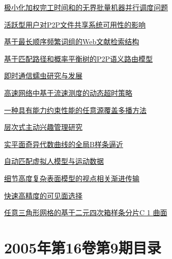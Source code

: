 \documentclass[a4paper]{article}
\begin{document}
\href{http://www.jos.org.cn/ch/reader/download_pdf.aspx?file_no=20061005&year_id=2006&quarter_id=10&falg=1}{极小化加权完工时间和的无界批量机器并行调度问题}

\href{http://www.jos.org.cn/ch/reader/download_pdf.aspx?file_no=20061007&year_id=2006&quarter_id=10&falg=1}{活跃型用户对P2P文件共享系统可用性的影响}

\href{http://www.jos.org.cn/ch/reader/download_pdf.aspx?file_no=20061008&year_id=2006&quarter_id=10&falg=1}{基于最长顺序频繁词组的Web文献检索结构}

\href{http://www.jos.org.cn/ch/reader/download_pdf.aspx?file_no=20061009&year_id=2006&quarter_id=10&falg=1}{基于匹配路径和概率平衡树的P2P语义路由模型}

\href{http://www.jos.org.cn/ch/reader/download_pdf.aspx?file_no=20061010&year_id=2006&quarter_id=10&falg=1}{即时通信蠕虫研究与发展}

\href{http://www.jos.org.cn/ch/reader/download_pdf.aspx?file_no=20061012&year_id=2006&quarter_id=10&falg=1}{高速网络中基于流速测度的动态超时策略}

\href{http://www.jos.org.cn/ch/reader/download_pdf.aspx?file_no=20061013&year_id=2006&quarter_id=10&falg=1}{一种具有能力约束性能的任意源覆盖多播方法}

\href{http://www.jos.org.cn/ch/reader/download_pdf.aspx?file_no=20061014&year_id=2006&quarter_id=10&falg=1}{层次式主动兴趣管理研究}

\href{http://www.jos.org.cn/ch/reader/download_pdf.aspx?file_no=20061015&year_id=2006&quarter_id=10&falg=1}{实平面奇异代数曲线的全局B样条逼近}

\href{http://www.jos.org.cn/ch/reader/download_pdf.aspx?file_no=20061016&year_id=2006&quarter_id=10&falg=1}{自动匹配虚拟人模型与运动数据}

\href{http://www.jos.org.cn/ch/reader/download_pdf.aspx?file_no=20061017&year_id=2006&quarter_id=10&falg=1}{细节高度复杂表面模型的视点相关渐进传输}

\href{http://www.jos.org.cn/ch/reader/download_pdf.aspx?file_no=20061018&year_id=2006&quarter_id=10&falg=1}{快速高精度的可见面选择}

\href{http://www.jos.org.cn/ch/reader/download_pdf.aspx?file_no=20061019&year_id=2006&quarter_id=10&falg=1}{任意三角形网格的基于二元四次箱样条分片C 1 曲面}


\section{\textbf{2005年第16卷第9期目录}}
\end{document}
